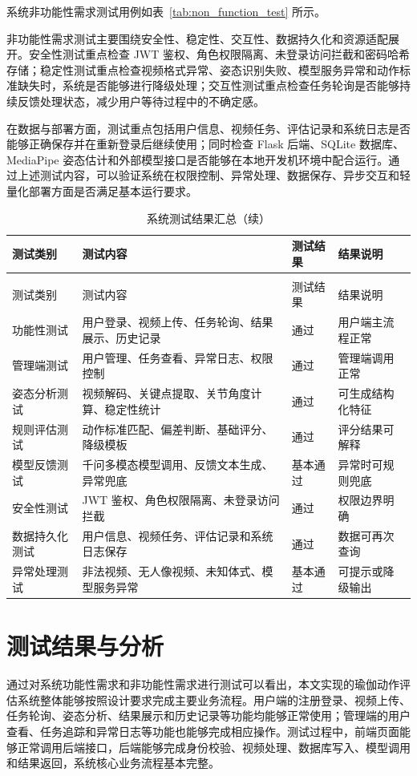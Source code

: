 \documentclass[UTF8,twoside]{ctexrep}
\makeatletter
\def@NAT@last@yr{\@citea}%
\def@NAT@last@yr{-\NAT@penalty}%
\makeatother
\begin{document}
系统非功能性需求测试用例如表~\ref{tab:non_function_test} 所示。



非功能性需求测试主要围绕安全性、稳定性、交互性、数据持久化和资源适配展开。安全性测试重点检查 JWT 鉴权、角色权限隔离、未登录访问拦截和密码哈希存储；稳定性测试重点检查视频格式异常、姿态识别失败、模型服务异常和动作标准缺失时，系统是否能够进行降级处理；交互性测试重点检查任务轮询是否能够持续反馈处理状态，减少用户等待过程中的不确定感。

在数据与部署方面，测试重点包括用户信息、视频任务、评估记录和系统日志是否能够正确保存并在重新登录后继续使用；同时检查 Flask 后端、SQLite 数据库、MediaPipe 姿态估计和外部模型接口是否能够在本地开发机环境中配合运行。通过上述测试内容，可以验证系统在权限控制、异常处理、数据保存、异步交互和轻量化部署方面是否满足基本运行要求。
{
\renewcommand{\arraystretch}{0.92}
\setlength{\tabcolsep}{3pt}
\begin{longtable}{p{2.35cm}p{5.55cm}p{1.45cm}p{3.65cm}}
  \caption{系统测试结果汇总}
  \label{tab:test_summary}\\
  \toprule
  测试类别 & 测试内容 & 测试结果 & 结果说明 \\
  \midrule
  \endfirsthead
  \caption[]{系统测试结果汇总（续）}\\
  \toprule
  测试类别 & 测试内容 & 测试结果 & 结果说明 \\
  \midrule
  \endhead
  \bottomrule
  \endfoot
  功能性测试 & 用户登录、视频上传、任务轮询、结果展示、历史记录 & 通过 & 用户端主流程正常 \\
  管理端测试 & 用户管理、任务查看、异常日志、权限控制 & 通过 & 管理端调用正常 \\
  姿态分析测试 & 视频解码、关键点提取、关节角度计算、稳定性统计 & 通过 & 可生成结构化特征 \\
  规则评估测试 & 动作标准匹配、偏差判断、基础评分、降级模板 & 通过 & 评分结果可解释 \\
  模型反馈测试 & 千问多模态模型调用、反馈文本生成、异常兜底 & 基本通过 & 异常时可规则兜底 \\
  安全性测试 & JWT 鉴权、角色权限隔离、未登录访问拦截 & 通过 & 权限边界明确 \\
  数据持久化测试 & 用户信息、视频任务、评估记录和系统日志保存 & 通过 & 数据可再次查询 \\
  异常处理测试 & 非法视频、无人像视频、未知体式、模型服务异常 & 基本通过 & 可提示或降级输出 \\
\end{longtable}
}

\section{测试结果与分析}
通过对系统功能性需求和非功能性需求进行测试可以看出，本文实现的瑜伽动作评估系统整体能够按照设计要求完成主要业务流程。用户端的注册登录、视频上传、任务轮询、姿态分析、结果展示和历史记录等功能均能够正常使用；管理端的用户查看、任务追踪和异常日志等功能也能够完成相应操作。测试过程中，前端页面能够正常调用后端接口，后端能够完成身份校验、视频处理、数据库写入、模型调用和结果返回，系统核心业务流程基本完整。
\end{document}
